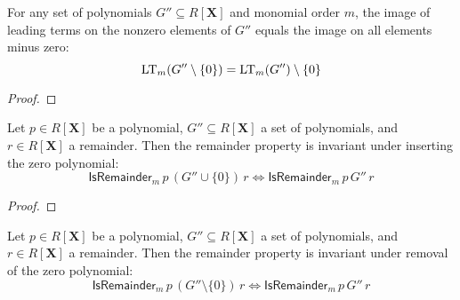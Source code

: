         \begin{lemma}\label{leadingTerm_image_sdiff_singleton_zero}
          \leanok
          For any set of polynomials $G'' \subseteq R[\mathbf{X}]$ and monomial order $m$,
the image of leading terms on the nonzero elements of $G''$ equals the image on all
elements minus zero:
\[
  \operatorname{LT}_m(G'' \setminus \{0\}) = \operatorname{LT}_m(G'') \setminus \{0\}
\]

        \end{lemma}
        
        \begin{proof}
          \leanok
        \end{proof}
        

        \begin{lemma}\label{isRemainder_of_insert_zero_iff_isRemainder}
          \leanok
          Let $p \in R[\mathbf{X}]$ be a polynomial, $G'' \subseteq R[\mathbf{X}]$ a set of polynomials,
and $r \in R[\mathbf{X}]$ a remainder. Then the remainder property is invariant under
inserting the zero polynomial:
\[
  \mathsf{IsRemainder}_m\,p\,(G'' \cup \{0\})\,r \iff \mathsf{IsRemainder}_m\,p\,G''\,r
\]

        \end{lemma}
        
        \begin{proof}
          \leanok
        \end{proof}
        

        \begin{lemma}\label{isRemainder_of_singleton_zero_iff_isRemainder}
          \leanok
          Let $p \in R[\mathbf{X}]$ be a polynomial, $G'' \subseteq R[\mathbf{X}]$ a set of polynomials,
and $r \in R[\mathbf{X}]$ a remainder. Then the remainder property is invariant under
removal of the zero polynomial:
\[
  \mathsf{IsRemainder}_m\,p\,(G'' \setminus \{0\})\,r \iff \mathsf{IsRemainder}_m\,p\,G''\,r
\]

        \end{lemma}
        
